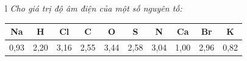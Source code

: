 \documentclass[border=5pt]{standalone}
\begin{document}
\renewcommand{\arraystretch}{1.55}
\setlength{\tabcolsep}{0pt}
\begin{tabular}{l}
\textit{\normalsize Cho giá trị độ âm điện của một số nguyên tố:}\\[4pt]
\begin{tabular}{|*{10}{C|}}
\hline
\textbf{\large Na} & \textbf{\large H} & \textbf{\large Cl} & \textbf{\large C} & \textbf{\large O} & \textbf{\large S} & \textbf{\large N} & \textbf{\large Ca} & \textbf{\large Br} & \textbf{\large K} \\
\hline
\large 0,93 & \large 2,20 & \large 3,16 & \large 2,55 & \large 3,44 & \large 2,58 & \large 3,04 & \large 1,00 & \large 2,96 & \large 0,82 \\
\hline
\end{tabular}
\end{tabular}
\end{document}
